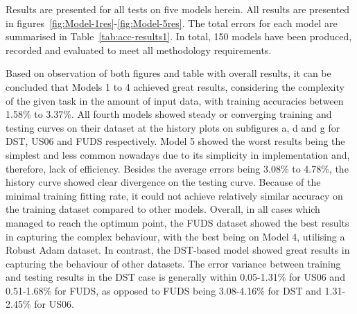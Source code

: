 
Results are presented for all tests on five models herein.
All results are presented in figures~\ref{fig:Model-1res}-\ref{fig:Model-5res}.
The total errors for each model are summarised in Table~\ref{tab:acc-results1}.
In total, 150 models have been produced, recorded and evaluated to meet all methodology requirements.

Based on observation of both figures and table with overall results, it can be concluded that Models 1 to 4 achieved great results, considering the complexity of the given task in the amount of input data, with training accuracies between 1.58\% to 3.37\%.
All fourth models showed steady or converging training and testing curves on their dataset at the history plots on subfigures a, d and g for DST, US06 and FUDS respectively.
Model 5 showed the worst results being the simplest and less common nowadays due to its simplicity in implementation and, therefore, lack of efficiency.
Besides the average errors being 3.08\% to 4.78\%, the history curve showed clear divergence on the testing curve. 
Because of the minimal training fitting rate, it could not achieve relatively similar accuracy on the training dataset compared to other models.
Overall, in all cases which managed to reach the optimum point, the FUDS dataset showed the best results in capturing the complex behaviour, with the best being on Model 4, utilising a Robust Adam dataset.
In contrast, the DST-based model showed great results in capturing the behaviour of other datasets.
The error variance between training and testing results in the DST case is generally within 0.05-1.31\% for US06 and 0.51-1.68\% for FUDS, as opposed to FUDS being 3.08-4.16\% for DST and 1.31-2.45\% for US06.

